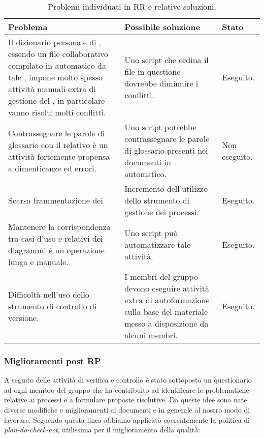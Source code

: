 		\begin{table}[H]
	    \begin{tabular}{ | p{5cm} | p{5cm} | p{2cm} | }
			\hline
			Problema & Possibile soluzione & Stato \\ \hline
		    Il dizionario personale di \glossario{Aspell}, essendo un file collaborativo compilato in automatico da tale \glossario{tool}, impone molto spesso attività manuali extra di gestione del \glossario{repository}, in particolare vanno risolti molti conflitti. & Uno script che ordina il file in questione dovrebbe diminuire i conflitti. & Eseguito. \\ \hline
			 Contrassegnare le parole di glossario con il relativo \glossario{tag} è un attività fortemente propensa a dimenticanze ed errori. & Uno script potrebbe contrassegnare le parole di glossario presenti nei documenti in automatico. & Non eseguito.  \\ \hline
			Scarsa frammentazione dei \glossario{task} & Incremento dell'utilizzo dello strumento di gestione dei processi. & Eseguito.   \\ \hline
			Mantenere la corrispondenza tra casi d'uso e relativi \glossario{url} dei diagrammi è un operazione lunga e manuale. & Uno script può automatizzare tale attività. & Eseguito. \\ \hline
			Difficoltà nell'uso dello strumento di controllo di versione. & I membri del gruppo devono eseguire attività extra di autoformazione sulla base del materiale messo a disposizione da alcuni membri. & Eseguito. \\	
			\hline
	    \end{tabular}
	    	\caption{Problemi individuati in RR e relative soluzioni.}
		\end{table}

		\subsubsection{Miglioramenti post RP}
		A seguito delle attività di verifica e controllo è stato sottoposto un questionario ad ogni membro del gruppo che ha contribuito ad identificare le problematiche relative ai processi e a formulare proposte risolutive. Da queste idee sono nate diverse modifiche e miglioramenti ai documenti e in generale al nostro modo di lavorare. Seguendo questa linea abbiamo applicato coerentemente la politica di \textit{plan-do-check-act}, utilissima per il miglioramento della qualità: \\
	
